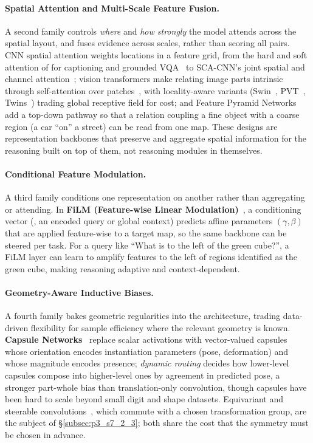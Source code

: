 \paragraph{Spatial Attention and Multi-Scale Feature Fusion.}
A second family controls \emph{where} and \emph{how strongly} the model attends across the spatial layout, and fuses evidence across scales, rather than scoring all pairs.
CNN spatial attention weights locations in a feature grid, from the hard and soft attention of \citet{xu2015show} for captioning and grounded VQA~\cite{zhu2016visual7w} to SCA-CNN's joint spatial and channel attention~\cite{chen2017sca}; vision transformers make relating image parts intrinsic through self-attention over patches~\cite{vit}, with locality-aware variants (Swin~\cite{liu2021swin}, PVT~\cite{wang2021pyramid}, Twins~\cite{chu2021twins}) trading global receptive field for cost; and Feature Pyramid Networks~\cite{lin2017feature} add a top-down pathway so that a relation coupling a fine object with a coarse region (a car ``on'' a street) can be read from one map.
These designs are representation backbones that preserve and aggregate spatial information for the reasoning built on top of them, not reasoning modules in themselves.

\paragraph{Conditional Feature Modulation.}
A third family conditions one representation on another rather than aggregating or attending.
In \textbf{FiLM (Feature-wise Linear Modulation)}~\cite{perez2018film}, a conditioning vector (\eg, an encoded query or global context) predicts affine parameters $(\gamma, \beta)$ that are applied feature-wise to a target map, so the same backbone can be steered per task.
For a query like ``What is to the left of the green cube?'', a FiLM layer can learn to amplify features to the left of regions identified as the green cube, making reasoning adaptive and context-dependent.

\paragraph{Geometry-Aware Inductive Biases.}
A fourth family bakes geometric regularities into the architecture, trading data-driven flexibility for sample efficiency where the relevant geometry is known.
\textbf{Capsule Networks}~\cite{sabour2017dynamic} replace scalar activations with vector-valued capsules whose orientation encodes instantiation parameters (pose, deformation) and whose magnitude encodes presence; \emph{dynamic routing} decides how lower-level capsules compose into higher-level ones by agreement in predicted pose, a stronger part-whole bias than translation-only convolution, though capsules have been hard to scale beyond small digit and shape datasets.
Equivariant and steerable convolutions~\cite{cohen2016group}, which commute with a chosen transformation group, are the subject of §\ref{subsec:p3_s7_2_3}; both share the cost that the symmetry must be chosen in advance.


